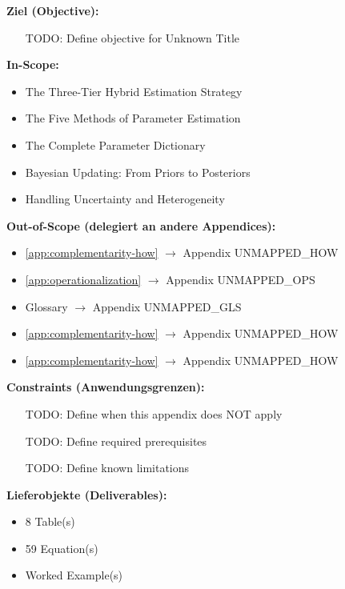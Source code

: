 \documentclass[11pt,a4paper]{article}
\theoremstyle{definition}
\begin{document}
\label{app:bbb-estimation}

\begin{tcolorbox}[
    colback=orange!5!white,
    colframe=orange!75!black,
    title={\textbf{Appendix Scope: Ziel / In-Scope / Out-of-Scope / Constraints}},
    fonttitle=\bfseries
]

\textbf{Ziel (Objective):}
\begin{itemize}[nosep]
    \item [TODO: Define objective for Unknown Title]
\end{itemize}

\textbf{In-Scope:}
\begin{itemize}[nosep]
    \item The Three-Tier Hybrid Estimation Strategy
    \item The Five Methods of Parameter Estimation
    \item The Complete Parameter Dictionary
    \item Bayesian Updating: From Priors to Posteriors
    \item Handling Uncertainty and Heterogeneity
\end{itemize}

\textbf{Out-of-Scope (delegiert an andere Appendices):}
\begin{itemize}[nosep]
    \item \ref{app:complementarity-how} $\rightarrow$ Appendix UNMAPPED_HOW
    \item \ref{app:operationalization} $\rightarrow$ Appendix UNMAPPED_OPS
    \item Glossary $\rightarrow$ Appendix UNMAPPED_GLS
    \item \ref{app:complementarity-how} $\rightarrow$ Appendix UNMAPPED_HOW
    \item \ref{app:complementarity-how} $\rightarrow$ Appendix UNMAPPED_HOW
\end{itemize}

\textbf{Constraints (Anwendungsgrenzen):}
\begin{itemize}[nosep]
    \item [TODO: Define when this appendix does NOT apply]
    \item [TODO: Define required prerequisites]
    \item [TODO: Define known limitations]
\end{itemize}

\textbf{Lieferobjekte (Deliverables):}
\begin{itemize}[nosep]
    \item 8 Table(s)
    \item 59 Equation(s)
    \item Worked Example(s)
\end{itemize}

\end{tcolorbox}
\end{document}
